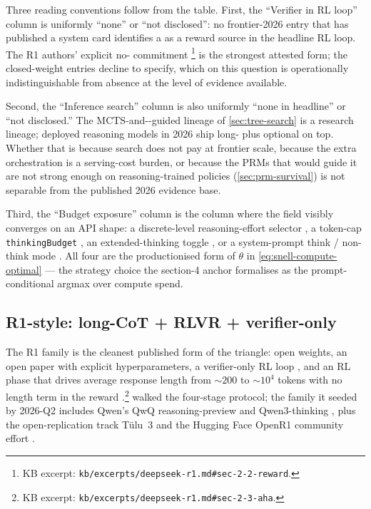 Three reading conventions follow from the table. First, the
``Verifier in RL loop'' column is uniformly ``none'' or ``not
disclosed'': no frontier-2026 entry that has published a system card
identifies a  as a reward source in the headline RL loop. The R1
authors' explicit no- commitment
\citep[\S 2.2]{deepseek-r1}\footnote{KB excerpt:
\texttt{kb/excerpts/deepseek-r1.md\#sec-2-2-reward}.} is the strongest
attested form; the closed-weight entries decline to specify, which on
this question is operationally indistinguishable from absence at the
level of evidence available.

Second, the ``Inference search'' column is also uniformly ``none in
headline'' or ``not disclosed.'' The MCTS-and--guided lineage of
\cref{sec:tree-search} is a research lineage; deployed reasoning models
in 2026 ship long- plus optional  on top. Whether
that is because search does not pay at frontier scale, because the
extra orchestration is a serving-cost burden, or because the PRMs that
would guide it are not strong enough on reasoning-trained policies
(\cref{sec:prm-survival}) is not separable from the published 2026
evidence base.

Third, the ``Budget exposure'' column is the column where the field
visibly converges on an API shape: a discrete-level reasoning-effort
selector , a token-cap
\texttt{thinkingBudget} , an
extended-thinking toggle , or a system-prompt
think / non-think mode . All four are the
productionised form of $\theta$ in \cref{eq:snell-compute-optimal} ---
the strategy choice the section-4 anchor formalises as the
prompt-conditional argmax over compute spend.

\subsection{R1-style: long-CoT + RLVR + verifier-only}
\label{sec:frontier-r1-family}

The R1 family is the cleanest published form of the triangle: open
weights, an open paper with explicit hyperparameters, a verifier-only
RL loop \citep[\S 2.2]{deepseek-r1}, and an RL phase that drives
average response length from $\sim\!200$ to $\sim\!10^4$ tokens with
no length term in the reward
\citep[\S 2.3]{deepseek-r1}.\footnote{KB excerpt:
\texttt{kb/excerpts/deepseek-r1.md\#sec-2-3-aha}.} 
walked the four-stage protocol; the family it seeded by 2026-Q2
includes Qwen's QwQ reasoning-preview  and Qwen3-thinking
, plus the open-replication
track Tülu~3 \citep{tulu3} and the Hugging Face OpenR1 community effort
.

